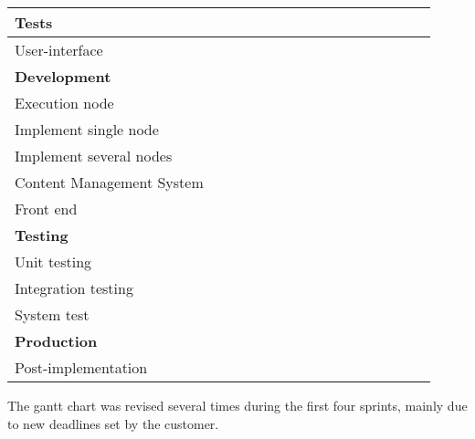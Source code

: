 \begin{table}
\begin{tabular}[h]{|l|l|l|l|l|l|l|l|l|l|l|l|l|l|l|l|}
\hline
Tests &&&\cellcolor{RoyalBlue}&\cellcolor{RoyalBlue}&\cellcolor{RoyalBlue}&\cellcolor{RoyalBlue}&&&&&&&&&  \\
\hline
User-interface&&&&&\cellcolor{MidnightBlue}&\cellcolor{MidnightBlue}&\cellcolor{MidnightBlue}&\cellcolor{MidnightBlue}&\cellcolor{MidnightBlue}&&&&&&  \\
\hline
\textbf{Development}&&&&\cellcolor{Purple}&\cellcolor{Purple}&\cellcolor{Purple}&\cellcolor{Purple}&\cellcolor{Purple}&\cellcolor{Purple}&\cellcolor{Purple}&\cellcolor{Purple}&&&&  \\
\hline
Execution node&&&&&&&&\cellcolor{Orchid}&\cellcolor{Orchid}&\cellcolor{Orchid}&\cellcolor{Orchid}&&&&  \\
\hline
Implement single node&&&&&&&&\cellcolor{Thistle}&\cellcolor{Thistle}&\cellcolor{Thistle}&&&&&  \\
\hline
Implement several nodes&&&&&&&&&\cellcolor{Thistle}&\cellcolor{Thistle}&&&&&  \\
\hline
Content Management System&&&&&&&&&&&\cellcolor{Orchid}&&&&  \\
\hline
Front end&&&&\cellcolor{Orchid}&\cellcolor{Orchid}&\cellcolor{Orchid}&\cellcolor{Orchid}&\cellcolor{Orchid}&\cellcolor{Orchid}&\cellcolor{Orchid}&\cellcolor{Orchid}&&&&  \\
\hline
\textbf{Testing}&&&&&&&\cellcolor{Red}&\cellcolor{Red}&\cellcolor{Red}&\cellcolor{Red}&\cellcolor{Red}&\cellcolor{Red}&\cellcolor{Red}&\cellcolor{Red}&\cellcolor{Red}  \\
\hline
Unit testing &&&&&&&\cellcolor{Orchid}&\cellcolor{Orchid}&\cellcolor{Orchid}&\cellcolor{Orchid}&\cellcolor{Orchid}&\cellcolor{Orchid}&\cellcolor{Orchid}&\cellcolor{Orchid}&\cellcolor{Orchid}  \\
\hline
Integration testing&&&&&&&&&\cellcolor{Melon}&\cellcolor{Melon}&\cellcolor{Melon}&\cellcolor{Melon}&\cellcolor{Melon}&\cellcolor{Melon}&\cellcolor{Melon}  \\
\hline
System test&&&&&&&&&\cellcolor{Melon}&\cellcolor{Melon}&\cellcolor{Melon}&\cellcolor{Melon}&\cellcolor{Melon}&\cellcolor{Melon}&\cellcolor{Melon}  \\
\hline
\textbf{Production}&&&&&&&&&&&&&&\cellcolor{MidnightBlue}&\cellcolor{MidnightBlue}  \\
\hline
Post-implementation&&&&&&&&&&&&&&&\cellcolor{Plum} \\
\hline
\end{tabular}
\end{table}

The gantt chart was revised several times during the first four sprints,
mainly due to new deadlines set by the customer. 

